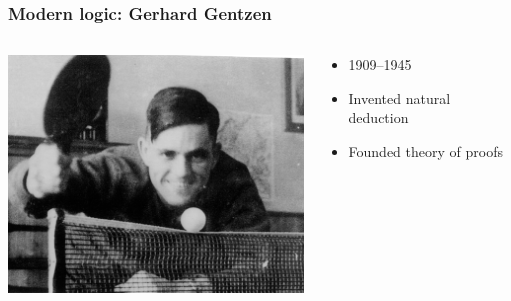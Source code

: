 \begin{frame}
  \frametitle{Modern logic: Gerhard Gentzen}

  \begin{columns}
    \begin{column}{.5\textwidth}
      \includegraphics[width=\textwidth]{../assets/gentzen}
    \end{column}
    \begin{column}{.5\textwidth}
      \begin{itemize}
        \item 1909--1945
        \item Invented natural deduction
        \item Founded theory of proofs
      \end{itemize}
    \end{column}
  \end{columns}
\end{frame}


